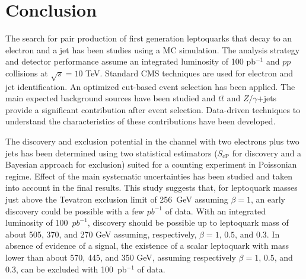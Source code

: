%

\section{Conclusion}

The search for pair production of first generation leptoquarks that decay to
an electron and a jet has been studies using a MC simulation.
The analysis strategy and detector performance assume an integrated luminosity of 100 pb$^{-1}$ and $pp$ collisions 
at $\sqrt{s}=10$ TeV.
Standard CMS techniques are used for electron and jet identification. 
An optimized cut-based event selection has been applied.
The main expected background sources have been studied and $t\bar{t}$ and $Z/\gamma$+jets 
provide a significant contribution after event selection. 
Data-driven techniques to understand the characteristics of these contributions have been developed.

The discovery and exclusion potential in the channel with two electrons plus two jets has 
been determined using two statistical estimators
($S_\text{cP}$ for discovery and a Bayesian approach for exclusion)
suited for a counting experiment in Poissonian regime.
Effect of the main systematic uncertainties has been studied and taken into account in the final 
results. This study suggests that, 
for leptoquark masses just above the Tevatron exclusion limit of 256~GeV assuming $\beta=1$, 
an early discovery could be possible with a few $pb^{-1}$ of data.
With an integrated luminosity of 100~$pb^{-1}$, discovery should be possible up
to leptoquark mass of about 505, 370, and 270 GeV assuming, respectively, 
$\beta=1$, $0.5$, and $0.3$. 
In absence of evidence of a signal, the existence of a scalar leptoquark 
with mass lower than about 570, 445, and 350 GeV, assuming respectively 
$\beta=1$, $0.5$, and $0.3$, can be excluded with 100~pb$^{-1}$ of data.




%
